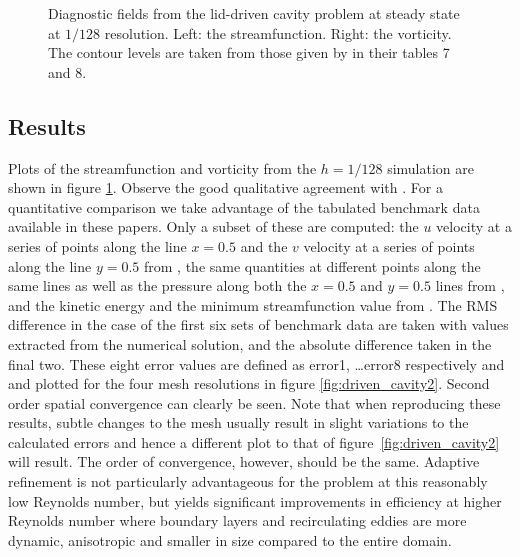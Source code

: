  

\begin{figure}
\centering
{}
\caption{Diagnostic fields from the lid-driven cavity problem at steady state at $1/128$ resolution.
Left: the streamfunction. Right: the vorticity. The contour levels are taken from those given by \cite{botella1998} in their tables
7 and 8.}
\label{fig:driven_cavity1}
\end{figure}


\subsection{Results}
Plots of the streamfunction and vorticity from the $h=1/128$ simulation are shown in figure \ref{fig:driven_cavity1}.
Observe the good qualitative agreement with \citep{botella1998,erturk2005,bruneau2006}. 
For a quantitative comparison we take advantage of the tabulated benchmark data available in these papers.
Only a subset of these are computed: the $u$ velocity at a series of points along the line $x=0.5$ and the
$v$ velocity at a series of points along the line $y=0.5$ from \citep{erturk2005}, the same quantities at
different points along the same lines as well as the pressure along both the $x=0.5$ and $y=0.5$ lines from 
\citep{botella1998}, and the kinetic energy and the minimum streamfunction value from \citep{bruneau2006}.
The RMS difference in the case of the first six sets of benchmark data are taken with values extracted from 
the numerical solution, and the absolute difference taken in the final two. These eight error values are
defined as error1, \ldots error8 respectively and and plotted for the four mesh resolutions in figure 
\ref{fig:driven_cavity2}.
Second order spatial convergence can clearly be seen.
Note that when reproducing these results, subtle changes to the mesh usually result in slight variations to the calculated errors and hence a different plot to that of figure~\ref{fig:driven_cavity2} will result. The order of convergence, however, should be the same.
Adaptive refinement is not particularly advantageous for the problem at this reasonably low Reynolds number, but
yields significant improvements in efficiency at higher Reynolds number where boundary layers and
recirculating eddies are more dynamic, anisotropic and smaller in size compared to the entire domain.

